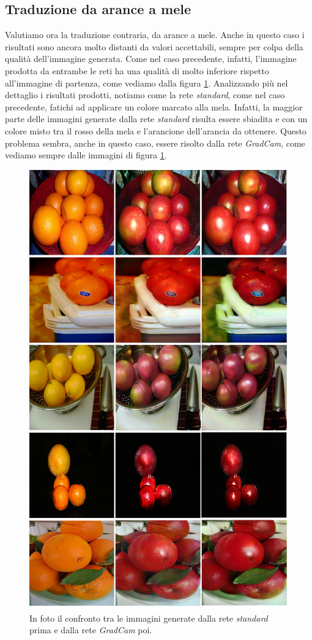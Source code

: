 \subsection{Traduzione da arance a mele}
Valutiamo ora la traduzione contraria, da arance a mele. Anche in questo caso i risultati sono ancora molto distanti da valori accettabili, sempre per colpa della qualità dell'immagine generata. Come nel caso precedente, infatti, l'immagine prodotta da entrambe le reti ha una qualità di molto inferiore rispetto all'immagine di partenza, come vediamo dalla figura \ref{fig:Confronto tra tutte le reti apple}.
Analizzando più nel dettaglio i risultati prodotti, notiamo come la rete \emph{standard}, come nel caso precedente, fatichi ad applicare un colore marcato alla mela. Infatti, la maggior parte delle immagini generate dalla rete \emph{standard} risulta essere sbiadita e con un colore misto tra il rosso della mela e l'arancione dell'arancia da ottenere. Questo problema sembra, anche in questo caso, essere risolto dalla rete \emph{GradCam}, come vediamo sempre dalle immagini di figura \ref{fig:Confronto tra tutte le reti apple}.

\begin{figure}[H]
\begin{center}
\includegraphics[width=0.6\columnwidth]{images/merge apple.png}
\end{center}
\caption{In foto il confronto tra le immagini generate dalla rete \emph{standard} prima e dalla rete \emph{GradCam} poi.}
\label{fig:Confronto tra tutte le reti apple}
\end{figure}  

